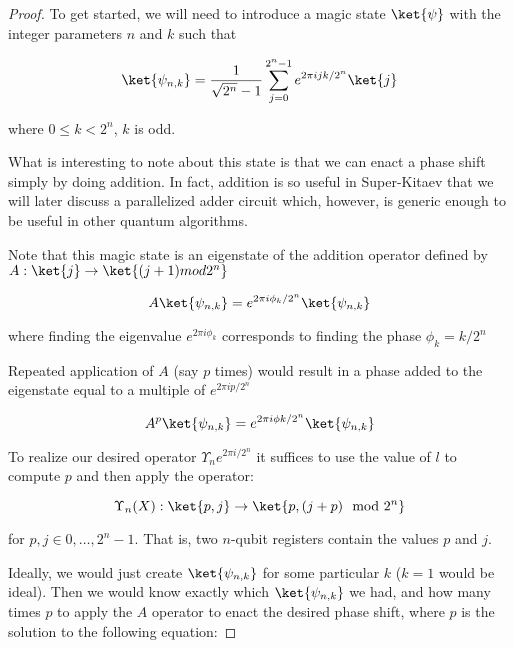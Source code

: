 \documentclass{article}
\theoremstyle{plain}
\begin{document}
\begin{proof}
To get started, we will need to introduce a magic state $\ket{\psi}$ with the
integer parameters $n$ and $k$ such that

\begin{equation}
\ket{\psi_{n,k}} = \frac{1}{\sqrt{2^n}-1} \sum_{j=0}^{2^n-1} e^{2\pi i j k / 2^n} \ket{j}
\end{equation}

where $0 \le k < 2^n$, $k$ is odd.

What is interesting to note about this state is that we can enact a phase
shift simply by doing addition. In fact, addition is so useful in Super-Kitaev
that we will later discuss a parallelized adder circuit which, however,
is generic enough to be useful in other quantum algorithms.


Note that this magic state is an eigenstate of the addition operator defined
by $A : \ket{j} \rightarrow \ket{(j+1) mod 2^n}$
 
\begin{equation}
A\ket{\psi_{n,k}} = e^{2\pi i \phi_k / 2^n} \ket{\psi_{n,k}}
\end{equation}

where finding the eigenvalue $e^{2\pi i \phi_k}$ corresponds to finding
the phase $\phi_k = k / 2^n$

Repeated application of $A$ (say $p$ times) would result in a phase
added to the eigenstate equal to a multiple of $e^{2\pi i p / 2^n}$

\begin{equation}
A^p\ket{\psi_{n,k}} = e^{2\pi i \phi k / 2^n} \ket{\psi_{n,k}}
\end{equation}

To realize our desired operator $\Upsilon_n{e^{2\pi i / 2^n}}$ it suffices
to use the value of $l$ to compute $p$ and then apply the operator:

\begin{equation}
\Upsilon_n(X) : \ket{p,j} \rightarrow \ket{p, (j+p) \mod 2^n}
\end{equation}

for $p,j \in {0,\ldots,2^n-1}$. That is, two $n$-qubit registers contain
the values $p$ and $j$.

Ideally, we would just create $\ket{\psi_{n,k}}$ for some particular $k$
($k=1$ would be ideal). Then we would know exactly which $\ket{\psi_{n,k}}$
we had, and how many times $p$ to apply the $A$ operator
to enact the desired phase shift, where $p$ is the solution to the
following equation:


\end{proof}
\end{document}
